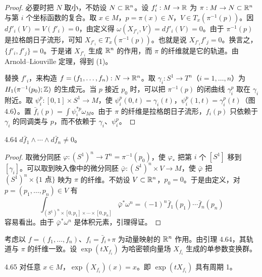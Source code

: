 \begin{proof}
  必要时把 $N$ 取小，不妨设 $N\subset\mathbb{R}^n$。设 $f'_i:M\to\mathbb{R}$ 为 $\pi:M\to N\subset\mathbb{R}^n$ 与第 $i$ 个坐标函数的复合。取 $x\in M$，$p=\pi(x)\in N$，$V\in T_x(\pi^{-1}(p))$。因 $df'_i(V)=V(f'_i)=0$，由定义得 $\omega(X_{f'_i},V)=df'_i(V)=0$。由于 $\pi^{-1}(p)$ 是拉格朗日子流形，可知 $X_{f'_i}\in T_x(\pi^{-1}(p))$。也就是说 $X_{f'_i}f'_j=0$。换言之，$\{f'_i,f'_j\}=0$。于是诸 $X_{f'_i}$ 生成 $\mathbb{R}^n$ 的作用，而 $\pi$ 的纤维就是它的轨道。由 Arnold–Liouville 定理，得到 (1)。

  替换 $f'_i$，来构造 $f=(f_1,\dots,f_n):N\to\mathbb{R}^n$。取 $\gamma_i:S^1\to T^n$（$i=1,\dots,n$）为 $H_1(\pi^{-1}(p_0);\mathbb{Z})$ 的生成元。当 $p$ 接近 $p_0$ 时，可以把 $\pi^{-1}(p)$ 的闭曲线 $\gamma^p_i$ 取在 $\gamma_i$ 附近。取 $\psi^p_i:[0,1]\times S^1\to M$，使 $\psi^p_i(0,t)=\gamma_i(t)$，$\psi^p_i(1,t)=\gamma^p_i(t)$（图 4.6）。置 $\bar f_i(p)=\int\psi^{*p}_i\omega_M$。由于 $\pi$ 的纤维是拉格朗日子流形，$f_i(p)$ 只依赖于 $\gamma_i$ 的同调类与 $p$，而不依赖于 $\gamma_i$、$\psi^p_i$。
\end{proof}

\begin{lemma*}{4.64}
  $d\bar f_1\wedge\cdots\wedge d\bar f_n\ne 0$。
\end{lemma*}

\begin{proof}
  取微分同胚 $\varphi:(S^1)^n\to T^n=\pi^{-1}(p_0)$，使 $\varphi_*$ 把第 $i$ 个 $[S^1]$ 移到 $[\gamma_i]$。可以取到映入像中的微分同胚 $\bar\varphi:(S^1)^n\times V\to M$，使 $\bar\varphi$ 把 $(S^1)^n\times\{1\text{ 点}\}$ 映为 $\pi$ 的纤维。不妨设 $V\subset\mathbb{R}^n$，$p_0=0$。于是由定义，对 $p=(p_1,\dots,p_n)\in V$ 有
  \[
    \int_{(S^1)^n\times[0,p_1]\times\cdots\times[0,p_n]}\bar\varphi^*\omega^n
    =(-1)^n\bar f_1(p_1)\cdots\bar f_n(p_n)
  \]
  容易看出。由于 $\bar\varphi^*\omega^n$ 是体积元素，引理得证。
\end{proof}

考虑以 $f=(f_1,\dots,f_n)$、$f_i=\bar f_i\circ\pi$ 为动量映射的 $\mathbb{R}^n$ 作用。由引理 4.64，其轨道与 $\pi$ 的纤维一致。设 $\exp(tX_{f_i})$ 为哈密顿向量场 $X_{f_i}$ 生成的单参数变换群。

\begin{lemma*}{4.65}
  对任意 $x\in M$，$\exp(X_{f_i})(x)=x$。即 $\exp(tX_{f_i})$ 具有周期 1。
\end{lemma*}


